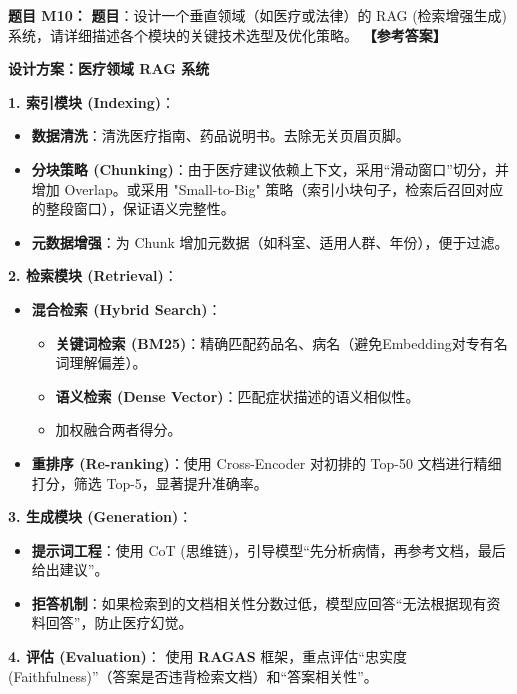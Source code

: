 \documentclass[a4paper,11pt]{article}
\newenvironment{question}[1]
    {\vspace{0.5cm}\noindent\textbf{题目 #1：}}
    {\vspace{0.2cm}}
\newenvironment{answer}
    {\noindent\textbf{【参考答案】}\par\small\color{blue}}
    {\par\vspace{0.5cm}\normalcolor}
\begin{document}
\begin{question}{M10}
\textbf{题目}：设计一个垂直领域（如医疗或法律）的 RAG (检索增强生成) 系统，请详细描述各个模块的关键技术选型及优化策略。
\end{question}
\begin{answer}
\textbf{设计方案：医疗领域 RAG 系统}

\textbf{1. 索引模块 (Indexing)}：
\begin{itemize}
    \item \textbf{数据清洗}：清洗医疗指南、药品说明书。去除无关页眉页脚。
    \item \textbf{分块策略 (Chunking)}：由于医疗建议依赖上下文，采用“滑动窗口”切分，并增加 Overlap。或采用 "Small-to-Big" 策略（索引小块句子，检索后召回对应的整段窗口），保证语义完整性。
    \item \textbf{元数据增强}：为 Chunk 增加元数据（如科室、适用人群、年份），便于过滤。
\end{itemize}

\textbf{2. 检索模块 (Retrieval)}：
\begin{itemize}
    \item \textbf{混合检索 (Hybrid Search)}：
    \begin{itemize}
        \item \textbf{关键词检索 (BM25)}：精确匹配药品名、病名（避免Embedding对专有名词理解偏差）。
        \item \textbf{语义检索 (Dense Vector)}：匹配症状描述的语义相似性。
        \item 加权融合两者得分。
    \end{itemize}
    \item \textbf{重排序 (Re-ranking)}：使用 Cross-Encoder 对初排的 Top-50 文档进行精细打分，筛选 Top-5，显著提升准确率。
\end{itemize}

\textbf{3. 生成模块 (Generation)}：
\begin{itemize}
    \item \textbf{提示词工程}：使用 CoT (思维链)，引导模型“先分析病情，再参考文档，最后给出建议”。
    \item \textbf{拒答机制}：如果检索到的文档相关性分数过低，模型应回答“无法根据现有资料回答”，防止医疗幻觉。
\end{itemize}

\textbf{4. 评估 (Evaluation)}：
使用 \textbf{RAGAS} 框架，重点评估“忠实度 (Faithfulness)”（答案是否违背检索文档）和“答案相关性”。
\end{answer}
\end{document}
